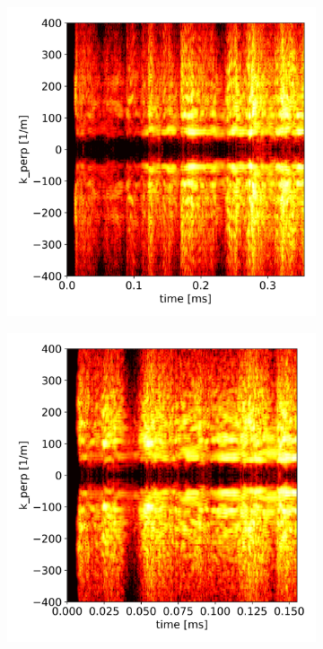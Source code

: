 \begin{figure}[H]\centering
	\begin{subfigure}[t]{0.45\textwidth}
		\centering
		\includegraphics[width=1\textwidth]{schemes/k_perp_time_spec1_n_PHIJ_mass_1.jpg}
		\label{fig:CIRC_evolutionKperp_PHIJ}
	\end{subfigure}
	\begin{subfigure}[t]{0.45\textwidth}
		\centering
		\includegraphics[width=1\textwidth]{schemes/k_perp_time_spec1_n_PHIAJ_beta_1.jpg}

\end{subfigure}
\end{figure}
